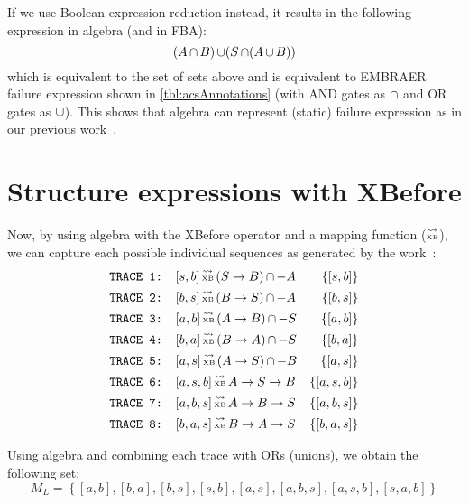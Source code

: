 \documentclass[12pt,openright,twoside,a4paper,oldfontcommands,english,brazil,final]{abntex2}
\theoremstyle{theo}
\newcommand{\EMBRAER}{EMBRAER\xspace}
\def\xbeforeop{\ensuremath\rightarrow}
\newcommand{\xbefore}[2]{\ensuremath #1 \xbeforeop #2 }
\def\tracetoalgebra{\ensuremath\operatorname{\stackrel{\leadsto}{\text{\tiny XB}}}}
\newcommand{\parsin}[1]{\ensuremath\left( #1 \right)}
\def\union{\ensuremath\operatorname{\cup}}
\def\inter{\ensuremath\operatorname{\cap}}
\begin{document}
If we use Boolean expression reduction instead, it results in the following expression in \ac{algebra} (and in \ac{FBA}):
\[
(A \inter B) \union (S \inter (A \union B))
\]
%
which is equivalent to the set of sets above and is equivalent to \EMBRAER failure expression shown in \cref{tbl:acsAnnotations} (with \ac{AND} gates as $\inter$ and \ac{OR} gates as $\union$).
%
This shows that \ac{algebra} can represent (static) failure expression as in our previous work~\cite{DM2012}.

\section{Structure expressions with \acs*{XBefore}}
\label{sec:case-study-xbefore}

Now, by using \ac{algebra} with the \ac{XBefore} operator and a mapping function ($\tracetoalgebra$), we can capture each possible individual sequences as generated by the work~\cite{DM2012}:
%
\begin{align*}
\text{\texttt{TRACE 1: }}&[s,b] \tracetoalgebra \parsin{\xbefore{S}{B}} \inter -A & \left\{[s,b]\right\}\\
\text{\texttt{TRACE 2: }}&[b,s] \tracetoalgebra \parsin{\xbefore{B}{S}} \inter -A & \left\{[b,s]\right\}\\
\text{\texttt{TRACE 3: }}&[a,b] \tracetoalgebra \parsin{\xbefore{A}{B}} \inter -S & \left\{[a,b]\right\}\\
\text{\texttt{TRACE 4: }}&[b,a] \tracetoalgebra \parsin{\xbefore{B}{A}} \inter -S & \left\{[b,a]\right\}\\
\text{\texttt{TRACE 5: }}&[a,s] \tracetoalgebra \parsin{\xbefore{A}{S}} \inter -B & \left\{[a,s]\right\}\\
\text{\texttt{TRACE 6: }}&[a,s,b] \tracetoalgebra \xbefore{\xbefore{A}{S}}{B} & \left\{[a,s,b]\right\}\\
\text{\texttt{TRACE 7: }}&[a,b,s] \tracetoalgebra \xbefore{\xbefore{A}{B}}{S} & \left\{[a,b,s]\right\}\\
\text{\texttt{TRACE 8: }}&[b,a,s] \tracetoalgebra \xbefore{\xbefore{B}{A}}{S} & \left\{[b,a,s]\right\}
\end{align*}

Using \ac{algebra} and combining each trace with \acp{OR} (unions), we obtain the following set:
%
\[
M_L =
  \left\{
    [a,b],[b,a],[b,s],[s,b],[a,s],
    [a,b,s],[a,s,b],[s,a,b]
  \right\}
\]
\end{document}
